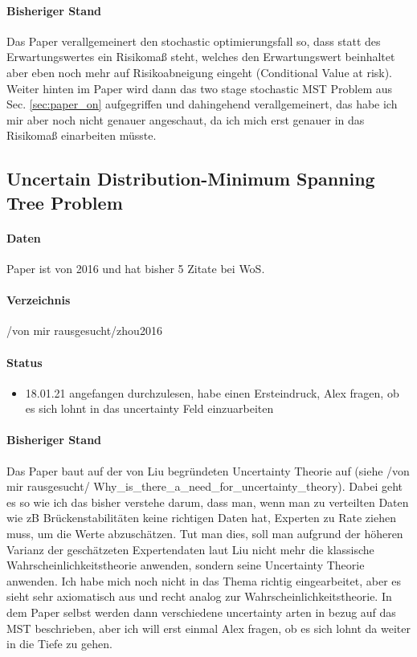 \documentclass[paper=a4,10pt]{scrartcl}
\begin{document}
\paragraph{Bisheriger Stand} Das Paper verallgemeinert den stochastic optimierungsfall so, dass statt des Erwartungswertes ein Risikomaß steht, welches den Erwartungswert beinhaltet aber eben noch mehr auf Risikoabneigung eingeht (Conditional Value at risk). Weiter hinten im Paper wird dann das two stage stochastic MST Problem aus Sec. \ref{sec:paper_on} aufgegriffen und dahingehend verallgemeinert, das habe ich mir aber noch nicht genauer angeschaut, da ich mich erst genauer in das Risikomaß einarbeiten müsste.


\subsection{Uncertain Distribution-Minimum Spanning Tree Problem}
\label{sec:paper_uncertain}
\paragraph{Daten} Paper ist von 2016 und hat bisher 5 Zitate bei WoS.
\paragraph{Verzeichnis} /von mir rausgesucht/zhou2016
\paragraph{Status}
\begin{itemize}
\item 18.01.21 angefangen durchzulesen, habe einen Ersteindruck, Alex fragen, ob es sich lohnt in das uncertainty Feld einzuarbeiten
\end{itemize}
\paragraph{Bisheriger Stand} Das Paper baut auf der von Liu begründeten Uncertainty Theorie auf (siehe /von mir rausgesucht/ Why\_is\_there\_a\_need\_for\_uncertainty\_theory). Dabei geht es so wie ich das bisher verstehe darum, dass man, wenn man zu verteilten Daten wie zB Brückenstabilitäten keine richtigen Daten hat, Experten zu Rate ziehen muss, um die Werte abzuschätzen. Tut man dies, soll man aufgrund der höheren Varianz der geschätzeten Expertendaten laut Liu nicht mehr die klassische Wahrscheinlichkeitstheorie anwenden, sondern seine Uncertainty Theorie anwenden. Ich habe mich noch nicht in das Thema richtig eingearbeitet, aber es sieht sehr axiomatisch aus und recht analog zur Wahrscheinlichkeitstheorie. 
In dem Paper selbst werden dann verschiedene uncertainty arten in bezug auf das MST beschrieben, aber ich will erst einmal Alex fragen, ob es sich lohnt da weiter in die Tiefe zu gehen. 
\end{document}
